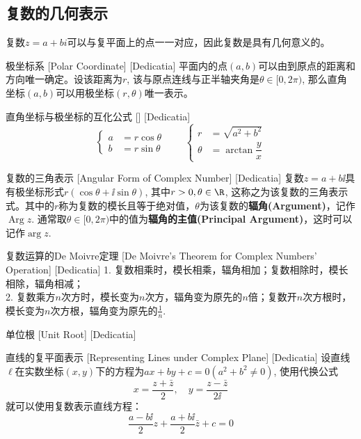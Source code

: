 \documentclass[UTF8]{ctexart}
\begin{document}
\subsection{复数的几何表示}
复数$z=a+bi$可以与复平面上的点一一对应，因此复数是具有几何意义的。
\begin{dfn}
    [UUID]
    {极坐标系}
    [Polar Coordinate]
    [Dedicatia]
    平面内的点$(a,b)$可以由到原点的距离和方向唯一确定。设该距离为$r$, 该与原点连线与正半轴夹角是$\theta\in[0,2\pi)$, 那么直角坐标$(a,b)$可以用极坐标$(r,\theta)$唯一表示。
\end{dfn}
\begin{ppt}
    [UUID]
    {直角坐标与极坐标的互化公式}
    []
    [Dedicatia]
    \[\begin{cases}
        a&=r\cos\theta\\
        b&=r\sin\theta
    \end{cases}\qquad\begin{cases}
        r&=\sqrt{a^2+b^2}\\
        \theta&=\arctan\dfrac{y}{x}
    \end{cases}\]
\end{ppt}
\begin{dfn}
    [AngularForm]
    {复数的三角表示}
    [Angular Form of Complex Number]
    [Dedicatia]
    复数$z=a+b\ii$具有极坐标形式$r(\cos\theta+\ii\sin\theta)$, 其中$r>0, \theta\in\R$, 这称之为该复数的三角表示式。其中的$r$称为复数的模长且等于绝对值，$\theta$为该复数的\textbf{辐角(Argument)}，记作$\operatorname{Arg} z$. 通常取$\theta\in[0,2\pi)$中的值为\textbf{辐角的主值(Principal Argument)}，这时可以记作$\arg{z}$.
\end{dfn}
\begin{thm}
    [UUID]
    {复数运算的De Moivre定理}
    [De Moivre's Theorem for Complex Numbers' Operation]
    [Dedicatia]
    1. 复数相乘时，模长相乘，辐角相加；复数相除时，模长相除，辐角相减；\\
    2. 复数乘方$n$次方时，模长变为$n$次方，辐角变为原先的$n$倍；复数开$n$次方根时，模长变为$n$次方根，辐角变为原先的$\frac{1}{n}$.
\end{thm}
\begin{dfn}
    [UUID]
    {单位根}
    [Unit Root]
    [Dedicatia]
\end{dfn}
\begin{dfn}
    [LinesComplexReprensting]
    {直线的复平面表示}
    [Representing Lines under Complex Plane]
    [Dedicatia]
    设直线$\ell$在实数坐标$(x,y)$下的方程为$ax+by+c=0(a^2+b^2\neq 0)$, 使用代换公式
    \[x=\frac{z+\bar{z}}{2},\quad y=\frac{z-\bar{z}}{2\ii}\]
    就可以使用复数表示直线方程：
    \[\frac{a-b\ii}{2}z+\frac{a+b\ii}{2}\bar{z}+c=0\]
\end{dfn}
\end{document}
